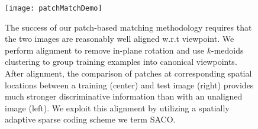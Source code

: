 \documentclass[10pt,twocolumn,letterpaper]{article}
\def\a{{\bf a}}
\def\D{{\bf D}}
\def\x{{\bf x}}
\def\vv{{\bf v}}
\def\argmin{\mathop{\rm argmin}}
\begin{document}
%



\begin{figure}[t]
\centering
   \texttt{[image: patchMatchDemo]}
\vspace{-1mm}
   \caption{The success of our patch-based matching methodology requires that
   the two images are reasonably well aligned w.r.t viewpoint.  We perform
   alignment to remove in-plane rotation and use $k$-medoids clustering to
   group training examples into canonical viewpoints.  After alignment, the
   comparison of patches at corresponding spatial locations between a training
   (center) and test image (right) provides much stronger discriminative
   information than with an unaligned image (left). We exploit this alignment
   by utilizing a spatially adaptive sparse coding scheme we term SACO.}
\label{fig:patchMatchDemo}
\vspace{-2mm}
\end{figure}
\end{document}
